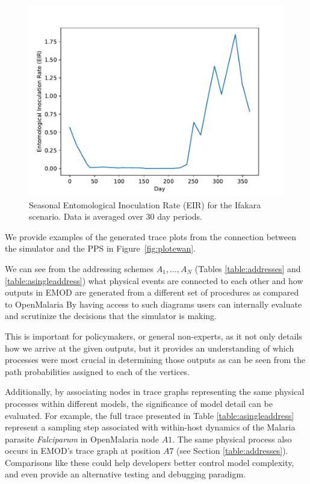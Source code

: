 \documentclass{article}
\begin{document}
\begin{figure}[h!]
  \centering
  \includegraphics[width=\textwidth/2]{../plots/EIR_Ifakara.pdf}
  \caption{Seasonal Entomological Inoculation Rate (EIR) for the Ifakara scenario. Data is averaged over $30$ day periods.}
  \label{fig:EIR}
\end{figure}

We provide examples of the generated trace plots from the connection between the simulator and the PPS in Figure~\ref{fig:plotewan}. 

We can see from the addressing schemes $A_1, \ldots, A_N$ (Tables \ref{table:addresses} and \ref{table:asingleaddress}) what physical events are connected to each other and how outputs in EMOD are generated from a different set of procedures as compared to OpenMalaria 
By having access to such diagrams users can internally evaluate and scrutinize the decisions that the simulator is making.

This is important for policymakers, or general non-experts, as it not only details how we arrive at the given outputs, but it provides an understanding of which processes were most crucial in determining those outputs as can be seen from the path probabilities assigned to each of the vertices. 

Additionally, by associating nodes in trace graphs representing the same physical processes within different models, the significance of model detail can be evaluated. For example, the full trace presented in Table \ref{table:asingleaddress} represent a sampling step associated with within-host dynamics of the Malaria parasite \textit{Falciparum} in OpenMalaria node $A1$. The same physical process also occurs in EMOD's trace graph at position $A7$ (see Section \ref{table:addresses}).
Comparisons like these could help developers better control model complexity, and even provide an alternative testing and debugging paradigm.
\end{document}
